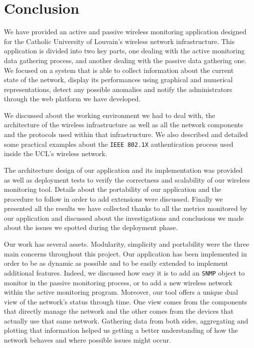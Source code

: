 
\chapter{Conclusion} %

\label{Chapter 7} %


We have provided an active and passive wireless monitoring application designed for the Catholic University of Louvain's wireless network infrastructure. This application is divided into two key parts, one dealing with the active monitoring data gathering process, and another dealing with the passive data gathering one. We focused on a system that is able to collect information about the current state of the network, display its performances using graphical and numerical representations, detect any possible anomalies and notify the administrators through the web platform we have developed.

We discussed about the working environment we had to deal with, the architecture of the wireless infrastructure as well as all the network components and the protocols used within that infrastructure. We also described and detailed some practical examples about the \texttt{IEEE 802.1X} authentication process used inside the UCL's wireless network.

The architecture design of our application and its implementation was provided as well as deployment tests to verify the correctness and scalability of our wireless monitoring tool. Details about the portability of our application and the procedure to follow in order to add extensions were discussed.  Finally we presented all the results we have collected thanks to all the metrics monitored by our application and discussed about the investigations and conclusions we made about the issues we spotted during the deployment phase.

Our work has several assets. Modularity, simplicity and portability were the three main concerns throughout this project. Our application has been implemented in order to be as dynamic as possible and to be easily extended to implement additional features. Indeed, we discussed how easy it is to add an \texttt{SNMP} object to monitor in the passive monitoring process, or to add a new wireless network within the active monitoring program. Moreover, our tool offers a unique dual view of the network's status through time. One view comes from the components that directly manage the network and the other comes from the devices that actually use that same network. Gathering data from both sides, aggregating and plotting that information helped us getting a better understanding of how the network behaves and where possible issues might occur.

